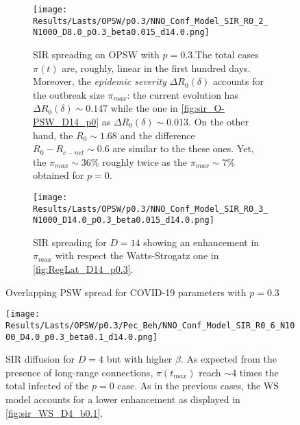 \documentclass[a4paper,10pt]{book} %
\theoremstyle{definition}
\begin{document}
\begin{figure}[htbp]
	\centering
	\begin{subfigure}[t]{\linewidth}
		\centering
		\texttt{[image: Results/Lasts/OPSW/p0.3/NNO\_Conf\_Model\_SIR\_R0\_2\_N1000\_D8.0\_p0.3\_beta0.015\_d14.0.png]}
		\caption{SIR spreading on OPSW with $ p = 0.3$.The total cases $ \pi(t)$ are, roughly, linear in the first hundred days. Moreover, the \textit{epidemic severity} $ \Delta R_0(\delta)$  accounts for the outbreak size $ \pi_{max}$: the current evolution has $\Delta R_0(\delta) \sim 0.147$ while the one in \autoref{fig:sir_O-PSW_D14_p0} as $ \Delta R_0(\delta) \sim 0.013$. On the other hand, the $R_0 \sim 1.68$ and the difference $R_0 - R_{c-net} \sim 0.6$ are similar to the these ones. Yet, the $\pi_{max} \sim 36\%$ roughly twice as the $\pi_{max} \sim 7\%$ obtained for $ p = 0$.}
		\label{fig:sir_O-PSW_D8_p0.3}
	\end{subfigure}
	\begin{subfigure}[t]{\linewidth}
		\centering
		\texttt{[image: Results/Lasts/OPSW/p0.3/NNO\_Conf\_Model\_SIR\_R0\_3\_N1000\_D14.0\_p0.3\_beta0.015\_d14.0.png]}
		\caption{SIR spreading for $ D = 14$ showing an enhancement in $ \pi_{max} $ with respect the Watts-Strogatz one in \autoref{fig:RegLat_D14_p0.3}.}
		\label{fig:sir_O-PSW_D14_p0.3}
	\end{subfigure}
	\caption{Overlapping PSW spread for COVID-19 parameters with $p = 0.3$ }
\end{figure}

\begin{figure}[H]
	\centering
	\texttt{[image: Results/Lasts/OPSW/p0.3/Pec\_Beh/NNO\_Conf\_Model\_SIR\_R0\_6\_N1000\_D4.0\_p0.3\_beta0.1\_d14.0.png]}
	\caption{SIR diffusion for $ D = 4$ but with higher $\beta$. As expected from the presence of long-range connections, $\pi(t_{max})$ reach $\sim 4$ times the total infected of the $ p=0$ case. As in the previous cases, the WS model accounts for a lower enhancement as displayed in \autoref{fig:sir_WS_D4_b0.1}.}
	\label{fig:sir_O-PSW_D8_b0.1}
\end{figure}

\clearpage
\end{document}
